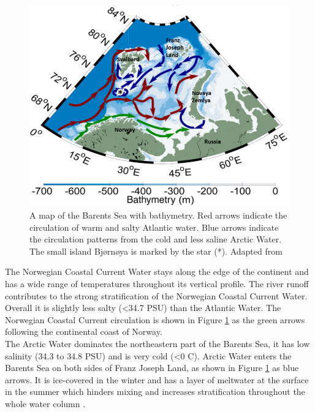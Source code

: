 \documentclass[a4paper, 12pt, Ariel]{article}
\begin{document}
\begin{figure}[H]
	\includegraphics[width=\textwidth]{CurrentsMap.png}
	\centering
	\caption{A map of the Barents Sea with bathymetry. Red arrows indicate the circulation of warm and salty Atlantic water. Blue arrows indicate the circulation patterns from the cold and less saline Arctic Water. The small island Bjørnøya is marked by the star (*). Adapted from \cite{Oziel2016}}
	\label{fig:currentsmap}
\end{figure}


The Norwegian Coastal Current Water stays along the edge of the continent and has a wide range of temperatures throughout its vertical profile. The river runoff contributes to the strong stratification of the Norwegian Coastal Current Water. Overall it is slightly less salty (\textless 34.7 PSU) than the Atlantic Water. The Norwegian Coastal Current circulation is shown in Figure \ref{fig:currentsmap} as the green arrows following the continental coast of  Norway.\\

The Arctic Water dominates the northeastern part of the Barents Sea, it has low salinity (34.3 to 34.8 PSU) and is very cold (\textless 0 \degree C). Arctic Water enters the Barents Sea on both sides of Franz Joseph Land, as shown in Figure \ref{fig:currentsmap} as blue arrows. It is ice-covered in the winter and has a layer of meltwater at the surface in the summer which hinders mixing and increases stratification throughout the whole water column \cite{Sakshaug2009}.  \\
\end{document}
